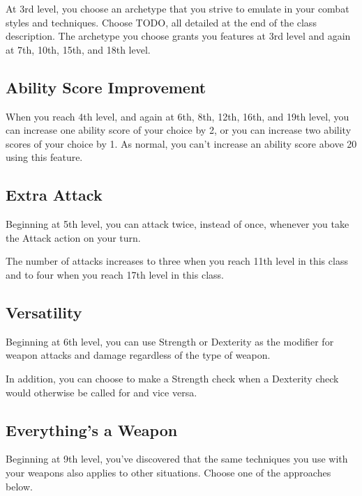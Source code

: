 At 3rd level, you choose an archetype that you strive to emulate in your combat styles and techniques. Choose TODO, all detailed at the end of the class description. The archetype you choose grants you features at 3rd level and again at 7th, 10th, 15th, and 18th level.

\subsection{Ability Score Improvement}

When you reach 4th level, and again at 6th, 8th, 12th, 16th, and 19th level, you can increase one ability score of your choice by 2, or you can increase two ability scores of your choice by 1. As normal, you can't increase an ability score above 20 using this feature.

\subsection{Extra Attack}

Beginning at 5th level, you can attack twice, instead of once, whenever you take the Attack action on your turn.

The number of attacks increases to three when you reach 11th level in this class and to four when you reach 17th level in this class.

\subsection{Versatility}
Beginning at 6th level, you can use Strength or Dexterity as the modifier for weapon attacks and damage regardless of the type of weapon.

In addition, you can choose to make a Strength check when a Dexterity check would otherwise be called for and vice versa.

\subsection{Everything's a Weapon}
Beginning at 9th level, you've discovered that the same techniques you use with your weapons also applies to other situations. Choose one of the approaches below.

